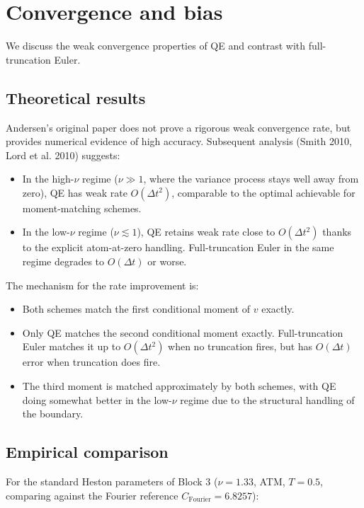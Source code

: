 \documentclass[11pt]{article}
\theoremstyle{plain}
\theoremstyle{definition}
\theoremstyle{remark}
\begin{document}
\section{Convergence and bias}

We discuss the weak convergence properties of QE and contrast with full-truncation Euler.

\subsection{Theoretical results}

Andersen's original paper does not prove a rigorous weak convergence rate, but provides numerical evidence of high accuracy. Subsequent analysis (Smith 2010, Lord et al. 2010) suggests:

\begin{itemize}[topsep=2pt]
    \item In the high-$\nu$ regime ($\nu \gg 1$, where the variance process stays well away from zero), QE has weak rate $O(\Delta t^2)$, comparable to the optimal achievable for moment-matching schemes.
    \item In the low-$\nu$ regime ($\nu \lesssim 1$), QE retains weak rate close to $O(\Delta t^2)$ thanks to the explicit atom-at-zero handling. Full-truncation Euler in the same regime degrades to $O(\Delta t)$ or worse.
\end{itemize}

The mechanism for the rate improvement is:
\begin{itemize}[topsep=2pt]
    \item Both schemes match the first conditional moment of $v$ exactly.
    \item Only QE matches the second conditional moment exactly. Full-truncation Euler matches it up to $O(\Delta t^2)$ when no truncation fires, but has $O(\Delta t)$ error when truncation does fire.
    \item The third moment is matched approximately by both schemes, with QE doing somewhat better in the low-$\nu$ regime due to the structural handling of the boundary.
\end{itemize}

\subsection{Empirical comparison}

For the standard Heston parameters of Block 3 ($\nu = 1.33$, ATM, $T = 0.5$, comparing against the Fourier reference $C_{\mathrm{Fourier}} = 6.8257$):
\end{document}

